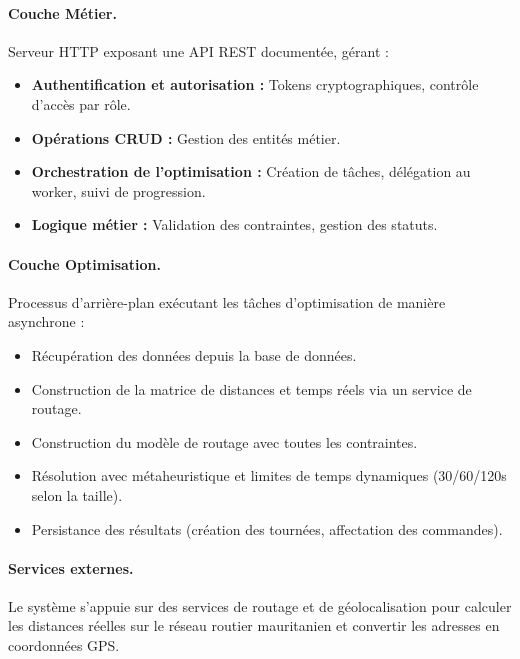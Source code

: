 \documentclass[12pt,a4paper]{report}
\begin{document}
\paragraph{Couche Métier.} Serveur HTTP exposant une API REST documentée, gérant :

\begin{itemize}[leftmargin=2.2em]
    \item \textbf{Authentification et autorisation :} Tokens cryptographiques, contrôle d'accès par rôle.

    \item \textbf{Opérations CRUD :} Gestion des entités métier.

    \item \textbf{Orchestration de l'optimisation :} Création de tâches, délégation au worker, suivi de progression.

    \item \textbf{Logique métier :} Validation des contraintes, gestion des statuts.
\end{itemize}

\paragraph{Couche Optimisation.} Processus d'arrière-plan exécutant les tâches d'optimisation de manière asynchrone :

\begin{itemize}[leftmargin=2.2em]
    \item Récupération des données depuis la base de données.

    \item Construction de la matrice de distances et temps réels via un service de routage.

    \item Construction du modèle de routage avec toutes les contraintes.

    \item Résolution avec métaheuristique et limites de temps dynamiques (30/60/120s selon la taille).

    \item Persistance des résultats (création des tournées, affectation des commandes).
\end{itemize}

\paragraph{Services externes.} Le système s'appuie sur des services de routage et de géolocalisation pour calculer les distances réelles sur le réseau routier mauritanien et convertir les adresses en coordonnées GPS.
\end{document}
